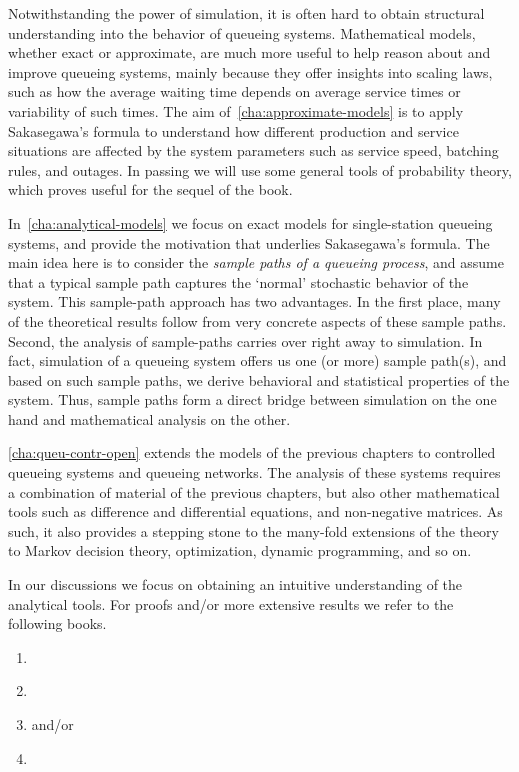 Notwithstanding the power of simulation, it is often hard to obtain structural understanding into the behavior of queueing systems.
Mathematical models, whether exact or approximate, are much more useful to help reason about and improve queueing systems, mainly because they offer insights into scaling laws, such as how the average waiting time depends on average service times or variability of such times.
The aim of~\cref{cha:approximate-models} is to apply Sakasegawa's formula to understand how different production and service situations are affected by the system parameters such as service speed, batching rules, and outages.
In passing we will use some general tools of probability theory, which proves useful for the sequel of the book.

In~\cref{cha:analytical-models} we focus on exact models for single-station queueing systems, and provide the motivation that underlies Sakasegawa's formula.
The main idea here is to consider the \emph{sample paths of a queueing process}, and assume that a typical sample path captures the `normal' stochastic behavior of the system.
This sample-path approach has two advantages.
In the first place, many of the theoretical results follow from very concrete aspects of these sample paths.
Second, the analysis of sample-paths carries over right away to simulation.
In fact, simulation of a queueing system offers us one (or more) sample path(s), and based on such sample paths, we derive behavioral and statistical properties of the system.
Thus, sample paths form a direct bridge between simulation on the one hand and mathematical analysis on the other.


\cref{cha:queu-contr-open} extends the models of the previous chapters to controlled queueing systems and queueing networks.
The analysis of these systems requires a combination of material of the previous chapters, but also other mathematical tools such as difference and differential equations, and non-negative matrices.
As such, it also provides a stepping stone to the many-fold extensions of the theory to Markov decision theory, optimization, dynamic programming, and so on.

In our discussions we focus on obtaining an intuitive understanding of the analytical tools. For proofs and/or more extensive results we refer to the following books.
\begin{enumerate}
\item \citet{bolch06:_queuein_networ_markov_chain}
\item \citet{el-taha98:_sampl_path_analy_queuein_system}
\item \citet{tijms94:_stoch_model_algor_approac} and/or \citet{tijms03:_first_cours_stoch_model}
\item \citet{capinski03:_probab_probl}
\end{enumerate}



